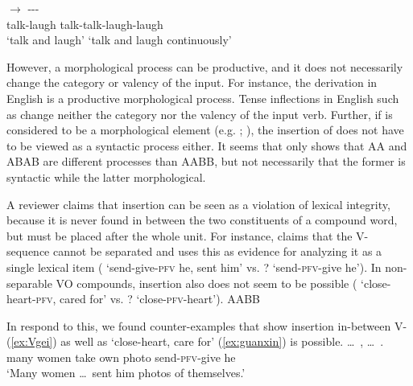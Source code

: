   \ex \gll {} $\rightarrow$ ---\\
  talk-laugh {} talk-talk-laugh-laugh\\ 
  \glt `talk and laugh' `talk and laugh continuously'
  \z
\z

However, a morphological process can be productive, and it does not necessarily change the category or valency of the input.
For instance, the  derivation in English is a productive morphological process.
Tense inflections in English such as  change neither the category nor the valency of the input verb.
Further, if  is considered to be a morphological element (e.g. \citealt[101--102]{Huangetal2009}; \citealt[246]{MuellerLipenkova2013}), the insertion of  does not have to be viewed as a syntactic
process either.
It seems that \citet{Xie2020} only shows that AA and ABAB are different processes than AABB, but not necessarily that the former is syntactic while the latter morphological.

A reviewer claims that  insertion can be seen as a violation of lexical integrity,
because it is never found in between the two constituents of a compound word,
but must be placed after the whole unit.
For instance, \citet[1282]{Her2006} claims that the V- sequence cannot be separated 
and uses this as evidence for analyzing it as a single lexical item 
(  `send-give-\textsc{pfv} he, sent him' vs. ?   `send-\textsc{pfv}-give he').
In non-separable VO compounds,  insertion also does not seem to be possible 
( `close-heart-\textsc{pfv}, cared for' vs. ?  `close-\textsc{pfv}-heart').
AABB

In respond to this, we found counter-examples that show  insertion in-between V- (\ref{ex:Vgei}) as well as  `close-heart, care for' (\ref{ex:guanxin}) is possible.
\ea\label{ex:Vgei}%
\gll \ldots\,  ,    \ldots\,  .\\
{} many women take own photo {} send-\textsc{pfv}-give he\\
\glt `Many women \ldots\, sent him photos of themselves.'
\z

